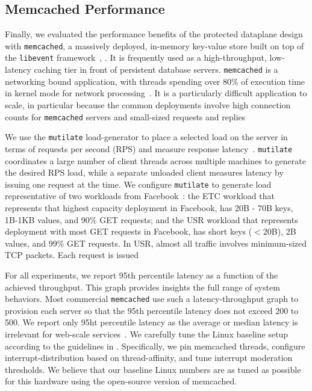 
\subsection{Memcached Performance}
\label{sec:eval:memcached}




Finally, we evaluated the performance benefits of the \ix protected
dataplane design with \texttt{memcached}, a massively deployed,
in-memory key-value store built on top of the \texttt{libevent}
framework~\cite{url:memcached}, . It is frequently used as a
high-throughput, low-latency caching tier in front of persistent
database servers. \texttt{memcached} is a networking bound
application, with threads spending over 80\% of execution time in
kernel mode for network processing~\cite{Leverich:RHSU:2014}. It is a
particularly difficult application to scale, in particular because the
common deployments involve high connection counts for
\texttt{memcached} servers and small-sized requests and
replies~\cite{nishtala2013scaling,Atikoglu:2012:WAL}

We use the \texttt{mutilate} load-generator to place a selected load
on the server in terms of requests per second (RPS) and measure
response latency~\cite{url:mutilate}. \texttt{mutilate} coordinates a
large number of client threads across multiple machines to generate
the desired RPS load, while a separate unloaded client measures
latency by issuing one request at the time.  We configure
\texttt{mutilate} to generate load representative of two workloads
from Facebook~\cite{Atikoglu:2012:WAL}: the ETC workload that
represents that highest capacity deployment in Facebook, has 20B - 70B
keys, 1B-1KB values, and 90\% GET requests; and the USR workload that
represents deployment with most GET requests in Facebook, has short
keys ($<$20B), 2B values, and 99\% GET requests. In USR, almost all
traffic involves minimum-sized TCP packets. Each request is issued 

For all experiments, we report 95th percentile latency as a function
of the achieved throughput. This graph provides insights the full range
of system behaviors. Most commercial \texttt{memcached} use such a
latency-throughput graph to provision each server so that the 95th
percentile latency does not exceed 200 to 500\microsecond. We report
only 95ht percentile latency as the average or median latency is
irrelevant for web-scale services~\cite{DBLP:journals/cacm/DeanB13}.
We carefully tune the Linux baseline setup according to the guidelines
in \cite{Leverich:RHSU:2014}. Specifically, we pin memcached threads,
configure interrupt-distribution based on thread-affinity, and tune
interrupt moderation thresholds. We believe that our baseline Linux
numbers are as tuned as possible for this hardware using the
open-source version of memcached. 

